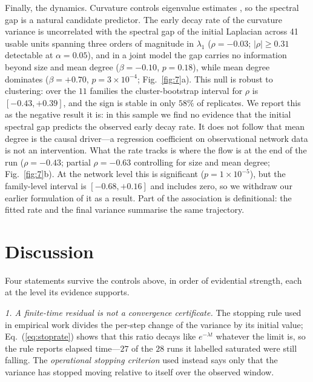 \documentclass[11pt]{article}
\begin{document}
Finally, the dynamics. Curvature controls eigenvalue estimates \cite{LinYau2010},
so the spectral gap is a natural candidate predictor. The early decay rate of the curvature
variance is uncorrelated with the spectral gap of the initial Laplacian across 41
usable units spanning three orders of magnitude in $\lambda_1$
($\rho = -0.03$; $|{\rho}| \ge 0.31$ detectable at $\alpha=0.05$), and in a
joint model the gap carries no information beyond size and mean degree
($\beta = -0.10$, $p = 0.18$), while mean degree dominates
($\beta = +0.70$, $p = 3\times10^{-4}$;
Fig.~\ref{fig:7}a). This null is robust to clustering: over the $11$ families
the cluster-bootstrap interval for $\rho$ is $[-0.43, +0.39]$, and the sign is
stable in only $58\%$ of replicates. We report this as the negative result it
is: in this sample we find no evidence that the initial spectral gap predicts the
observed early decay rate. It does not
follow that mean degree is the causal driver---a regression coefficient on
observational network data is not an intervention.
What the rate tracks is where the flow is at the end of the run
($\rho=-0.43$; partial $\rho=-0.63$ controlling for size and mean degree;
Fig.~\ref{fig:7}b). At the network level this is significant
($p=1\times10^{-5}$), but the family-level interval is $[-0.68,+0.16]$ and
includes zero, so we withdraw our earlier formulation of it as a result. Part of
the association is definitional: the fitted rate and the final variance
summarise the same trajectory.

\section*{Discussion}

Four statements survive the controls above, in order of evidential
strength, each at the level its evidence supports.

\emph{1. A finite-time residual is not a convergence certificate.} The stopping
rule used in empirical work divides the per-step change of the variance by its
initial value; Eq.~(\ref{eq:stoprate}) shows that this ratio decays like
$e^{-\lambda t}$ whatever the limit is, so the rule reports elapsed
time---$27$ of the $28$ runs it labelled saturated were still falling. The
\emph{operational
stopping criterion} used instead says only that the variance has stopped moving
relative to itself over the observed window.
\end{document}

